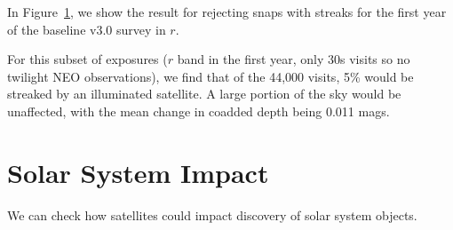 In Figure~\ref{fig:depth_change}, we show the result for rejecting snaps with streaks for the first year of the baseline v3.0 survey in $r$. 

For this subset of exposures ($r$ band in the first year, only 30s visits so no twilight NEO observations), we find that of the 44,000 visits, 5\% would be streaked by an illuminated satellite. A large portion of the sky would be unaffected, with the mean change in coadded depth being 0.011 mags. 

\begin{figure}
\caption{ \label{fig:depth_change}}
\end{figure}



\section{Solar System Impact}


We can check how satellites could impact discovery of solar system objects. 